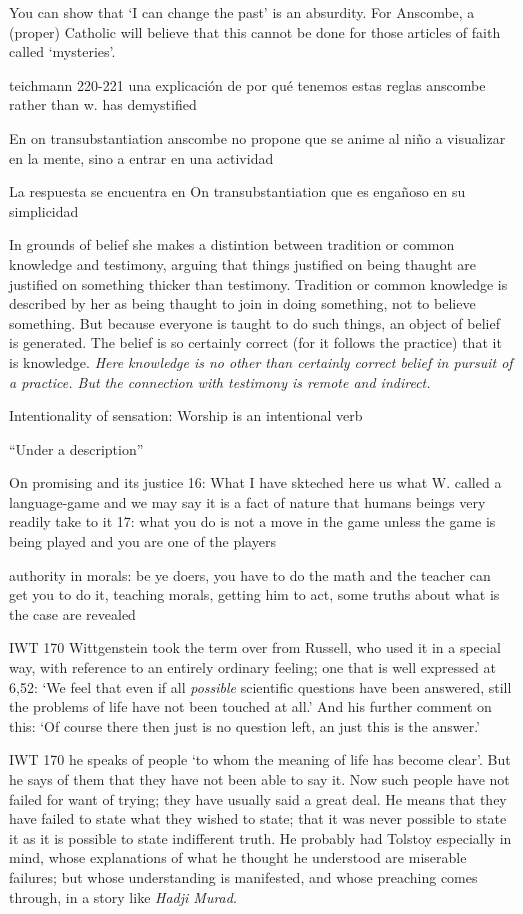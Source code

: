   You can show that `I can change the past' is an absurdity.
  For Anscombe, a (proper) Catholic will believe that this cannot be done for those articles of faith called `mysteries'.

  teichmann 220-221
  una explicación de por qué tenemos estas reglas anscombe rather than w. has demystified

En on transubstantiation anscombe no propone que se anime al niño a visualizar en la mente, sino a entrar en una actividad



La respuesta se encuentra en On transubstantiation que es engañoso en su simplicidad

In grounds of belief she makes a distintion between tradition or common knowledge and testimony, arguing that things justified on being thaught are justified on something thicker than testimony. Tradition or common knowledge is described by her as being thaught to join in doing something, not to believe something. But because everyone is taught to do such things, an object of belief is generated. The belief is so certainly correct (for it follows the practice) that it is knowledge. \emph{Here knowledge is no other than certainly correct belief in pursuit of a practice. But the connection with testimony is remote and
indirect.}

Intentionality of sensation: Worship is an intentional verb

``Under a description''

On promising and its justice 16: What I have skteched here us what W. called a language-game and we may say it is a fact of nature that humans beings very readily take to it
17: what you do is not a move in the game unless the game is being played and you are one of the players

authority in morals: be ye doers, you have to do the math and the teacher can get you to do it, teaching morals, getting him to act, some truths about what is the case are revealed

IWT 170 Wittgenstein took the term over from Russell, who used it in a special way, with reference to an entirely ordinary feeling; one that is well expressed at 6,52: `We feel that even if all \emph{possible} scientific questions have been answered, still the problems of life have not been touched at all.' And his further comment on this: `Of course there then just is no question left, an just this is the answer.'

IWT 170 he speaks of people `to whom the meaning of life has become clear'. But he says of them that they have not been able to say it. Now such people have not failed for want of trying; they have usually said a great deal. He means that they have failed to state what they wished to state; that it was never possible to state it as it is possible to state indifferent truth. He probably had Tolstoy especially in mind, whose explanations of what he thought he understood are miserable failures; but whose understanding is manifested, and whose preaching comes through, in a story like \emph{Hadji Murad}.

